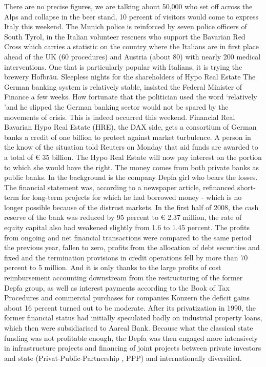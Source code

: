 There are no precise figures, we are talking about 50,000 who set off across the Alps and collapse in the beer stand, 10 percent of visitors would come to express Italy this weekend.
The Munich police is reinforced by seven police officers of South Tyrol, in the Italian volunteer rescuers who support the Bavarian Red Cross which carries a statistic on the country where the Italians are in first place ahead of the UK (60 procedures) and Austria (about 80) with nearly 200 medical interventions.
One that is particularly popular with Italians, it is trying the brewery Hofbräu.
Sleepless nights for the shareholders of Hypo Real Estate
The German banking system is relatively stable, insisted the Federal Minister of Finance a few weeks.
How fortunate that the politician used the word `relatively 'and he slipped the German banking sector would not be spared by the movements of crisis.
This is indeed occurred this weekend.
Financial Real Bavarian Hypo Real Estate (HRE), the DAX side, gets a consortium of German banks a credit of one billion to protect against market turbulence.
A person in the know of the situation told Reuters on Monday that aid funds are awarded to a total of € 35 billion.
The Hypo Real Estate will now pay interest on the portion to which she would have the right.
The money comes from both private banks as public banks.
In the background is the company Depfa girl who bears the losses.
The financial statement was, according to a newspaper article, refinanced short-term for long-term projects for which he had borrowed money - which is no longer possible because of the distrust markets.
In the first half of 2008, the cash reserve of the bank was reduced by 95 percent to € 2.37 million, the rate of equity capital also had weakened slightly from 1.6 to 1.45 percent.
The profits from ongoing and net financial transactions were compared to the same period the previous year, fallen to zero, profits from the allocation of debt securities and fixed and the termination provisions in credit operations fell by more than 70 percent to 5 million.
And it is only thanks to the large profits of cost reimbursement accounting downstream from the restructuring of the former Depfa group, as well as interest payments according to the Book of Tax Procedures and commercial purchases for companies Konzern the deficit gains about 16 percent turned out to be moderate.
After its privatization in 1990, the former financial status had initially speculated badly on industrial property loans, which then were subsidiarised to Aareal Bank.
Because what the classical state funding was not profitable enough, the Depfa was then engaged more intensively in infrastructure projects and financing of joint projects between private investors and state (Privat-Public-Partnership , PPP) and internationally diversified.

